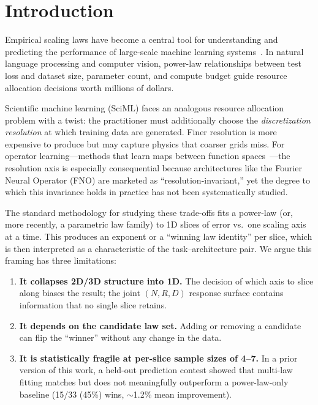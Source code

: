 \documentclass[11pt]{article}
\newcommand{\holdoutWinFraction}{15/33 (45\%)}
\newcommand{\holdoutMeanImprovement}{1.2\%}
\begin{document}
\section{Introduction}
\label{sec:intro}

Empirical scaling laws have become a central tool for understanding and
predicting the performance of large-scale machine learning
systems~\citep{kaplan2020scaling,hoffmann2022training}. In natural
language processing and computer vision, power-law relationships between
test loss and dataset size, parameter count, and compute budget guide
resource allocation decisions worth millions of dollars.

Scientific machine learning (SciML) faces an analogous resource
allocation problem with a twist: the practitioner must additionally
choose the \emph{discretization resolution} at which training data are
generated. Finer resolution is more expensive to produce but may
capture physics that coarser grids miss. For operator
learning---methods that learn maps between function
spaces~\citep{lu2021learning,li2021fourier}---the resolution axis is
especially consequential because architectures like the Fourier Neural
Operator (FNO) are marketed as ``resolution-invariant,'' yet the
degree to which this invariance holds in practice has not been
systematically studied.

The standard methodology for studying these trade-offs fits a
power-law (or, more recently, a parametric law family) to 1D slices
of error vs.\ one scaling axis at a time. This produces an exponent
or a ``winning law identity'' per slice, which is then interpreted
as a characteristic of the task--architecture pair. We argue this
framing has three limitations:

\begin{enumerate}
  \item \textbf{It collapses 2D/3D structure into 1D.} The decision
    of which axis to slice along biases the result; the joint $(N, R, D)$
    response surface contains information that no single slice retains.
  \item \textbf{It depends on the candidate law set.} Adding or
    removing a candidate can flip the ``winner'' without any change
    in the data.
  \item \textbf{It is statistically fragile at per-slice sample
    sizes of 4--7.} In a prior version of this work, a held-out
    prediction contest showed that multi-law fitting matches but does
    not meaningfully outperform a power-law-only baseline
    (\holdoutWinFraction{} wins, ${\sim}$\holdoutMeanImprovement{}
    mean improvement).
\end{enumerate}
\end{document}
